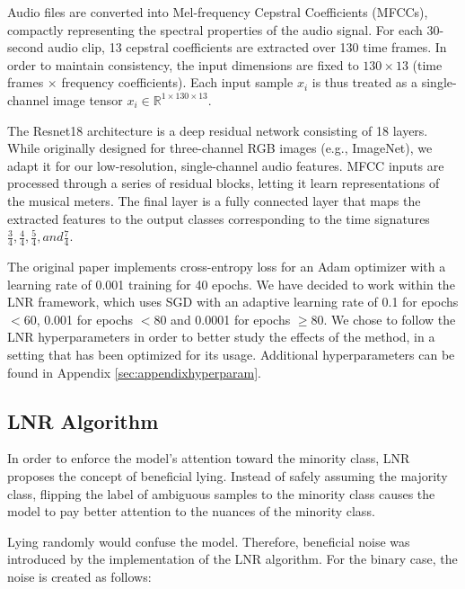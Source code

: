 \documentclass{article}
\begin{document}
Audio files are converted into Mel-frequency Cepstral Coefficients (MFCCs), compactly representing the spectral properties of the audio signal. For each 30-second audio clip, 13 cepstral coefficients are extracted over 130 time frames. In order to maintain consistency, the input dimensions are fixed to $130 \times 13$ (time frames $\times$ frequency coefficients). Each input sample $x_i$ is thus treated as a single-channel image tensor $x_i \in \mathbb{R}^{1 \times 130 \times 13}$.

The Resnet18 architecture is a deep residual network consisting of 18 layers. While originally designed for three-channel RGB images (e.g., ImageNet), we adapt it for our low-resolution, single-channel audio features. MFCC inputs are processed through a series of residual blocks, letting it learn representations of the musical meters. The final layer is a fully connected layer that maps the extracted features to the output classes corresponding to the time signatures $\frac{3}{4}, \frac{4}{4}, \frac{5}{4}, and \frac{7}{4}$.

The original paper implements cross-entropy loss for an Adam optimizer with a learning rate of 0.001 training for 40 epochs. We have decided to work within the LNR framework, which uses SGD with an adaptive learning rate of 0.1 for epochs $<60$, 0.001 for epochs $<80$ and 0.0001 for epochs $\geq 80$. We chose to follow the LNR hyperparameters in order to better study the effects of the method, in a setting that has been optimized for its usage. Additional hyperparameters can be found in Appendix \ref{sec:appendixhyperparam}.


\subsection{LNR Algorithm}

In order to enforce the model's attention toward the minority class, LNR proposes the concept of beneficial lying. Instead of safely assuming the majority class, flipping the label of ambiguous samples to the minority class causes the model to pay better attention to the nuances of the minority class.

Lying randomly would confuse the model. Therefore, beneficial noise was introduced by the implementation of the LNR algorithm. For the binary case, the noise is created as follows:
\end{document}

